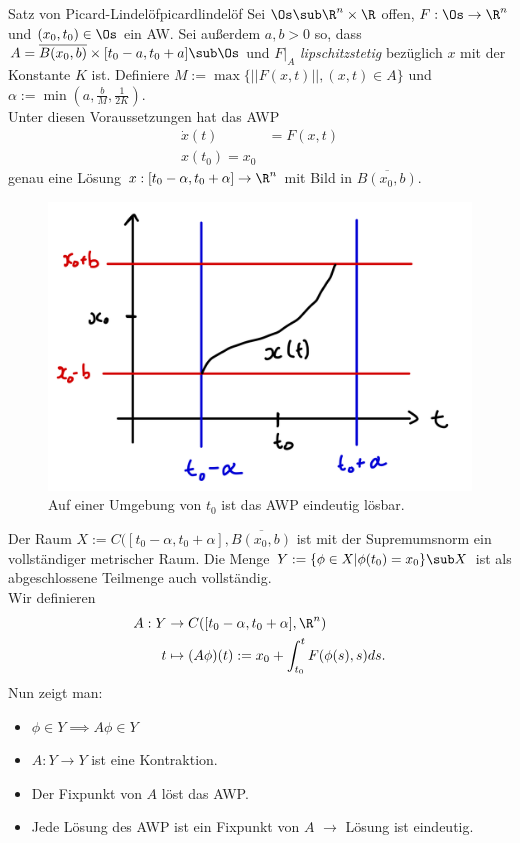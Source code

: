 \begin{theorem}{Satz von Picard-Lindelöf}{picardlindelöf}
Sei $\Os \sub \R^n \times \R$ offen, $F: \Os \to \R^n$ und $(x_0, t_0) \in \Os$ ein AW. Sei außerdem $a, b > 0$ so, dass $A=\overline{B(x_0,b)} \times [t_0 -a, t_0+a] \sub \Os$ und $F|_A$ \textit{lipschitzstetig} bezüglich $x$ mit der Konstante $K$ ist. Definiere $M:= \max \{||F(x,t)||, (x,t) \in A \}$ und $\alpha := \min \left( a, \frac{b}{M}, \frac{1}{2K}\right)$.\\
Unter diesen Voraussetzungen hat das AWP
\begin{align}
\dot{x}(t) &= F(x, t) \\
x(t_0)=x_0
\end{align}
genau eine Lösung $x: [t_0 - \alpha, t_0 + \alpha] \to \R^n$ mit Bild in $\overline{B(x_0,b)}$.
\begin{figure}[H]
\label{fig:picard}
\centering
\includegraphics[width=0.3\linewidth]{Bilder/picard.png}
\caption{Auf einer Umgebung von $t_0$ ist das AWP eindeutig lösbar.}
\end{figure}
\end{theorem}
\begin{beweis}
Der Raum $X:= C([t_0 - \alpha, t_0 + \alpha], \overline{B(x_0, b)}$ ist mit der Supremumsnorm ein vollständiger metrischer Raum. Die Menge $Y:= \{ \phi \in X | \phi(t_0)=x_0 \} \sub X$ ist als abgeschlossene Teilmenge auch vollständig.\\
Wir definieren 
\begin{align}
A: Y &\to C([t_0 - \alpha, t_0 + \alpha], \R^n)\\
t &\mapsto (A\phi)(t) := x_0 + \int_{t_0}^t F(\phi(s), s) ds.
\end{align}
Nun zeigt man:
\begin{itemize}
\item $\phi \in Y \implies A\phi \in Y$
\item $A: Y \to Y$ ist eine Kontraktion.
\item Der Fixpunkt von $A$ löst das AWP.
\item Jede Lösung des AWP ist ein Fixpunkt von $A$ $\rightarrow$ Lösung ist eindeutig.
\end{itemize}
\end{beweis}
